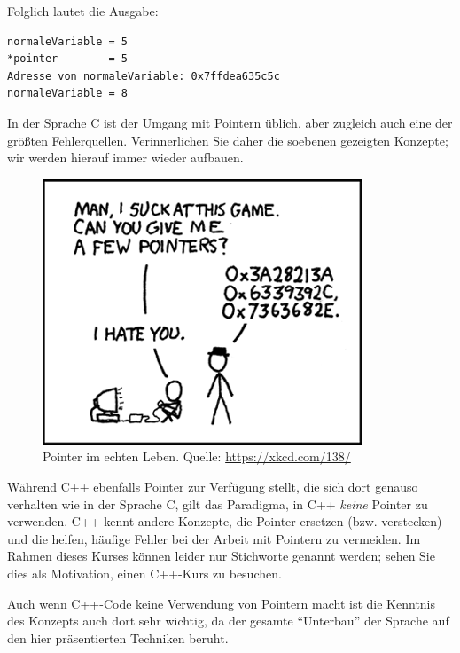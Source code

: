 Folglich lautet die Ausgabe:

\begin{cmdbox}
\begin{verbatim}
normaleVariable = 5
*pointer        = 5
Adresse von normaleVariable: 0x7ffdea635c5c
normaleVariable = 8
\end{verbatim}
\end{cmdbox}

\begin{warnbox}
In der Sprache C ist der Umgang mit Pointern üblich, aber zugleich auch eine der größten Fehlerquellen. Verinnerlichen Sie daher die soebenen gezeigten Konzepte; wir werden hierauf immer wieder aufbauen.
\end{warnbox}

\FloatBarrier
\begin{figure}
\begin{center}
\includegraphics[width=.5\linewidth]{./gfx/xkcd-pointers}
\caption[Pointer im echten Leben]{Pointer im echten Leben. Quelle: \url{https://xkcd.com/138/}}
\end{center}
\end{figure}
\FloatBarrier

\begin{plusbox}
Während C++ ebenfalls Pointer zur Verfügung stellt, die sich dort genauso verhalten wie in der Sprache C, gilt das Paradigma, in C++ \emph{keine} Pointer zu verwenden. C++ kennt andere Konzepte, die Pointer ersetzen (bzw. verstecken) und die helfen, häufige Fehler bei der Arbeit mit Pointern zu vermeiden. Im Rahmen dieses Kurses können leider nur Stichworte genannt werden; sehen Sie dies als Motivation, einen C++-Kurs zu besuchen.

Auch wenn C++-Code \idR keine Verwendung von Pointern macht ist die Kenntnis des Konzepts auch dort sehr wichtig, da der gesamte \enquote{Unterbau} der Sprache auf den hier präsentierten Techniken beruht.
\end{plusbox}

